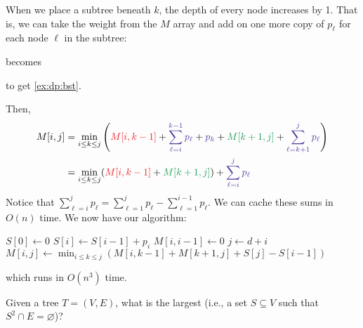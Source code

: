 When we place a subtree beneath $k$, the depth of every node increases by 1.
That is, we can take the weight from the $M$ array and add on one more copy of $p_\ell$
for each node $\ell$ in the subtree:
\begin{center}
  becomes
  to get \cref{ex:dp:bst}.
\end{center}
Then,
\begin{align*}
  M[i,j]
   & = \min_{i \leq k \leq j}\qty({\color{Red}M[i,k-1]} + {\color{Violet}\sum_{\ell=i}^{k-1}p_\ell} + {\color{Violet}p_k} + {\color{ForestGreen}M[k+1,j]} + {\color{Violet}\sum_{\ell=k+1}^j p_\ell}) \\
   & = \min_{i \leq k \leq j}({\color{Red}M[i,k-1]} + {\color{ForestGreen}M[k+1,j]}) + \color{Violet}\sum_{\ell=i}^j p_\ell
\end{align*}
Notice that $\sum_{\ell=i}^j p_\ell = \sum_{\ell=1}^j p_\ell - \sum_{\ell=1}^{i-1} p_\ell$.
We can cache these sums in $O(n)$ time.
We now have our algorithm:

\begin{algorithm}[H]
  \caption{}
  \begin{algorithmic}[1]
    \State $S[0] \gets 0$
      \State $S[i] \gets S[i-1] + p_i$
    \EndFor
      \State $M[i,i-1] \gets 0$
    \EndFor
     
        \State $j \gets d + i$
        \State $M[i,j] \gets \min_{i \leq k \leq j}(M[i,k-1]+M[k+1,j] + S[j] - S[i-1])$
      \EndFor
    \EndFor
  \end{algorithmic}
\end{algorithm}
which runs in $O(n^3)$ time.

\begin{problem}
  Given a tree $T = (V,E)$, what is the largest 
  (i.e., a set $S \subseteq V$ such that $S^2 \cap E = \varnothing$)?
\end{problem}

